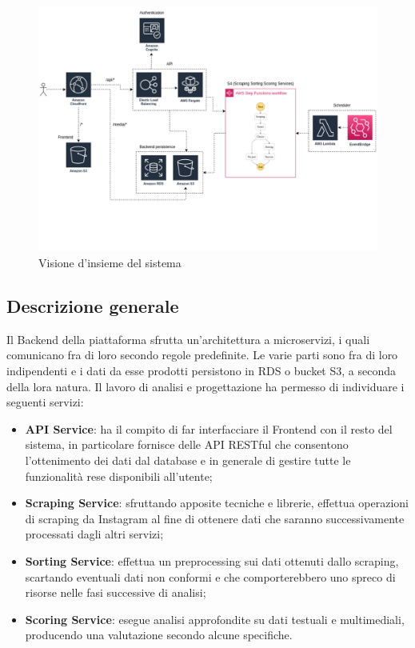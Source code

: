 \begin{figure}[!h]
    \includegraphics[width=16cm]{sezioni/images/overview.png}
    \centering
    \caption{Visione d'insieme del sistema}
\end{figure}

\subsection{Descrizione generale}
Il Backend della piattaforma sfrutta un'architettura a microservizi, i quali comunicano fra di loro secondo regole predefinite.
Le varie parti sono fra di loro indipendenti e i dati da esse prodotti persistono in RDS o bucket S3, a seconda della lora natura.
Il lavoro di analisi e progettazione ha permesso di individuare i seguenti servizi:
\begin{itemize}
    \item \textbf{API Service}: ha il compito di far interfacciare il Frontend con il resto del sistema, in particolare fornisce
    delle API RESTful che consentono l'ottenimento dei dati dal database e in generale di gestire tutte le funzionalità rese disponibili all'utente;
    \item \textbf{Scraping Service}: sfruttando apposite tecniche e librerie, effettua operazioni di scraping da Instagram al fine di ottenere dati che
    saranno successivamente processati dagli altri servizi;
    \item \textbf{Sorting Service}: effettua un preprocessing sui dati ottenuti dallo scraping, scartando eventuali dati non conformi e che comporterebbero
    uno spreco di risorse nelle fasi successive di analisi;
    \item \textbf{Scoring Service}: esegue analisi approfondite su dati testuali e multimediali, producendo una valutazione secondo alcune specifiche.
\end{itemize}

